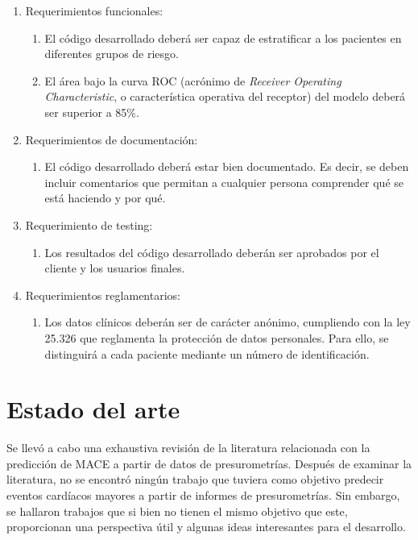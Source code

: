 \begin{enumerate}
	\item Requerimientos funcionales:
		\begin{enumerate}
			\item El código desarrollado deberá ser 
			capaz de estratificar a los pacientes en diferentes grupos de riesgo.
			\item El área bajo la curva ROC (acrónimo de \emph{Receiver Operating Characteristic}, 
			o característica operativa del receptor) del modelo deberá ser superior a 85\%.
		\end{enumerate}
	\item Requerimientos de documentación:
		\begin{enumerate}
			\item El código desarrollado deberá estar bien documentado. 
			Es decir, se deben incluir comentarios que permitan a cualquier persona comprender
			qué se está haciendo y por qué. 
		\end{enumerate}
	\item Requerimiento de testing:
		\begin{enumerate}
			\item Los resultados del código desarrollado deberán ser aprobados por el cliente 
			y los usuarios finales.
		\end{enumerate}
	\item Requerimientos reglamentarios:
		\begin{enumerate}
			\item Los datos clínicos deberán ser de carácter anónimo, cumpliendo con la ley 25.326 que reglamenta la protección de datos personales. 
			Para ello, se distinguirá a cada paciente mediante un número de identificación.
		\end{enumerate}

\end{enumerate}




\section{Estado del arte}

Se llevó a cabo una exhaustiva revisión de la literatura relacionada con la predicción 
de MACE a partir de datos de presurometrías.
Después de examinar la literatura, no se encontró ningún trabajo que tuviera como objetivo predecir eventos 
cardíacos mayores a partir de informes de presurometrías. Sin embargo, se hallaron trabajos que si bien no 
tienen el mismo objetivo que este, proporcionan una perspectiva útil y algunas ideas interesantes
 para el desarrollo.

